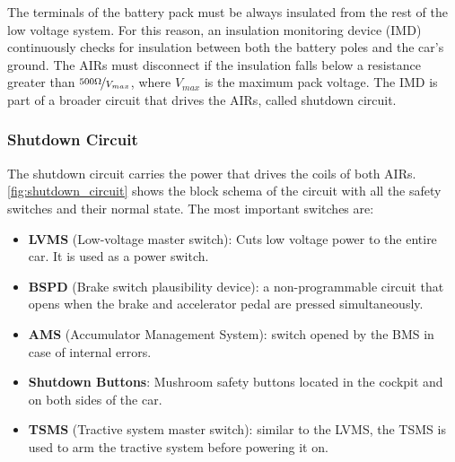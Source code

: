 The terminals of the battery pack must be always insulated from the rest of the low voltage system. For this reason, an insulation monitoring device (IMD) continuously checks for insulation between both the battery poles and the car's ground. The AIRs must disconnect if the insulation falls below a resistance greater than $\nicefrac{500\Omega}{V_{max}}$, where $V_{max}$ is the maximum pack voltage. The IMD is part of a broader circuit that drives the AIRs, called shutdown circuit.

\subsubsection{Shutdown Circuit}
The shutdown circuit carries the power that drives the coils of both AIRs. \autoref{fig:shutdown_circuit} shows the block schema of the circuit with all the safety switches and their normal state.
The most important switches are:
\begin{itemize}
    \item \textbf{LVMS} (Low-voltage master switch): Cuts low voltage power to the entire car. It is used as a power switch.
    \item \textbf{BSPD} (Brake switch plausibility device): a non-programmable circuit that opens when the brake and accelerator pedal are pressed simultaneously.
    \item \textbf{AMS} (Accumulator Management System): switch opened by the BMS in case of internal errors.
    \item \textbf{Shutdown Buttons}: Mushroom safety buttons located in the cockpit and on both sides of the car.
    \item \textbf{TSMS} (Tractive system master switch): similar to the LVMS, the TSMS is used to arm the tractive system before powering it on.
\end{itemize}

